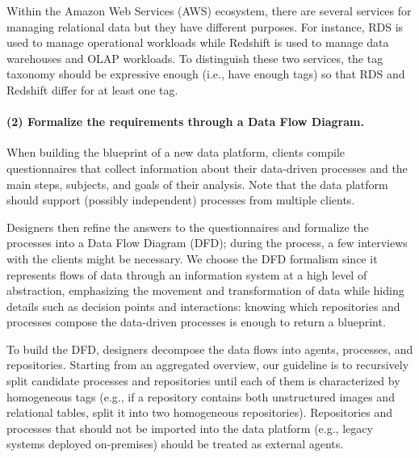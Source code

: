 \begin{example}
Within the Amazon Web Services (AWS) ecosystem, there are several services for managing relational data but they have different purposes. For instance, RDS is used to manage operational workloads while Redshift is used to manage data warehouses and OLAP workloads. To distinguish these two services, the tag taxonomy should be expressive enough (i.e., have enough tags) so that RDS and Redshift differ for at least one tag.
\end{example}

\paragraph{(2) Formalize the requirements through a Data Flow Diagram.}
When building the blueprint of a new data platform, clients compile questionnaires that collect information about their data-driven processes and the main steps, subjects, and goals of their analysis. Note that the data platform should support (possibly independent) processes from multiple clients.

Designers then refine the answers to the questionnaires and formalize the processes into a Data Flow Diagram (DFD); during the process, a few interviews with the clients might be necessary. We choose the DFD formalism \cite{DeMarco78} since it represents flows of data through an information system at a high level of abstraction, emphasizing the movement and transformation of data while hiding details such as decision points and interactions: knowing which repositories and processes compose the data-driven processes is enough to return a blueprint.

To build the DFD, designers decompose the data flows into agents, processes, and repositories. Starting from an aggregated overview, our guideline is to recursively split candidate processes and repositories until each of them is characterized by homogeneous tags (e.g., if a repository contains both unstructured images and relational tables, split it into two homogeneous repositories). Repositories and processes that should not be imported into the data platform (e.g., legacy systems deployed on-premises) should be treated as external agents.

